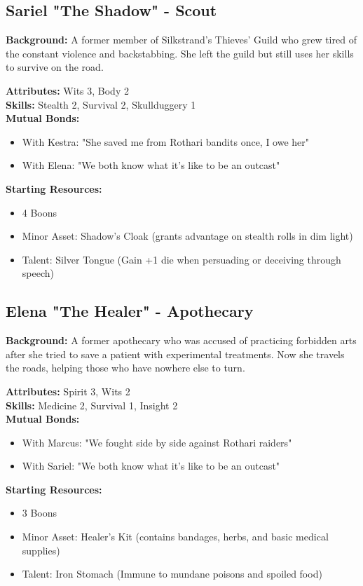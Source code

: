 \documentclass[11pt]{article}
\newenvironment{characterbox}[1]{%
  \begin{mdframed}[backgroundcolor=shadecolor, linewidth=1pt, linecolor=headercolor]%
  \subsection*{#1}%
}{%
  \end{mdframed}%
}
\begin{document}
\begin{characterbox}{Sariel "The Shadow" - Scout}
\textbf{Background:} A former member of Silkstrand's Thieves' Guild who grew tired of the constant violence and backstabbing. She left the guild but still uses her skills to survive on the road.

\textbf{Attributes:} Wits 3, Body 2 \\
\textbf{Skills:} Stealth 2, Survival 2, Skullduggery 1 \\
\textbf{Mutual Bonds:} 
\begin{itemize}
\item With Kestra: "She saved me from Rothari bandits once, I owe her"
\item With Elena: "We both know what it's like to be an outcast"
\end{itemize}

\textbf{Starting Resources:}
\begin{itemize}
\item 4 Boons
\item Minor Asset: Shadow's Cloak (grants advantage on stealth rolls in dim light)
\item Talent: Silver Tongue (Gain +1 die when persuading or deceiving through speech)
\end{itemize}
\end{characterbox}

\begin{characterbox}{Elena "The Healer" - Apothecary}
\textbf{Background:} A former apothecary who was accused of practicing forbidden arts after she tried to save a patient with experimental treatments. Now she travels the roads, helping those who have nowhere else to turn.

\textbf{Attributes:} Spirit 3, Wits 2 \\
\textbf{Skills:} Medicine 2, Survival 1, Insight 2 \\
\textbf{Mutual Bonds:} 
\begin{itemize}
\item With Marcus: "We fought side by side against Rothari raiders"
\item With Sariel: "We both know what it's like to be an outcast"
\end{itemize}

\textbf{Starting Resources:}
\begin{itemize}
\item 3 Boons
\item Minor Asset: Healer's Kit (contains bandages, herbs, and basic medical supplies)
\item Talent: Iron Stomach (Immune to mundane poisons and spoiled food)
\end{itemize}
\end{characterbox}
\end{document}
